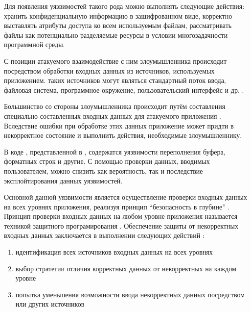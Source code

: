 %
Для  появления уязвимостей такого рода можно выполнять следующие действия: хранить конфиденциальную информацию в зашифрованном виде, корректно выставлять атрибуты доступа ко всем используемым файлам, рассматривать файлы как потенциально разделяемые ресурсы в условии многозадачности программной среды.



%
%
С позиции атакуемого  взаимодействие с ним злоумышленника происходит посредством обработки входных данных из источников, используемых приложением. 
%
 таких источников могут являться стандартный поток ввода, файловая система, программное окружение, пользовательский интерфейс и др.  . 

%
Большинство  со стороны злоумышленника происходит путём составления специально составленных входных данных для атакуемого приложения . 
%
Вследствие ошибки при обработке этих данных приложение может придти в некорректное состояние и выполнить действия, необходимые злоумышленнику. 

%
В коде , представленной в , содержатся уязвимости переполнения буфера, форматных строк и другие. 
%
С помощью проверки данных, вводимых пользователем, можно снизить как вероятность, так и последствие эксплойтирования данных уязвимостей. 

%
Основной  данной уязвимости является осуществление проверки входных данных на всех уровнях приложения, реализуя принцип ``безопасность в глубине'' . 
%
Принцип проверки входных данных на любом уровне приложения называется техникой защитного програмирования . 
%
Обеспечение защиты от некорректных входных данных заключается в выполнении следующих действий : 
\begin{enumerate}

	\item идентификация всех источников входных данных на всех уровнях 

	\item выбор стратегии отличия корректных данных от некорректных на каждом уровне 

	\item попытка уменьшения возможности ввода некорректных данных посредством  или других источников
\end{enumerate}

